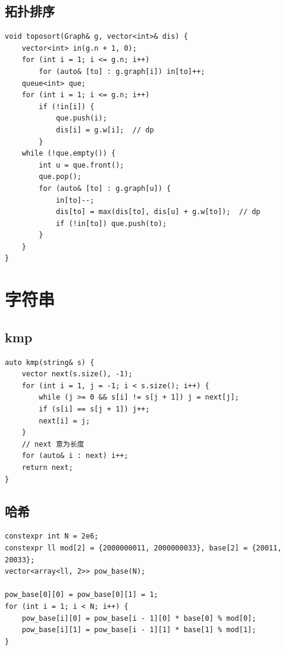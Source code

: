 \documentclass[UTF8]{ctexart}
\begin{document}
\begin{sloppypar}
\subsection{拓扑排序}

\begin{lstlisting}[style=cpp]
void toposort(Graph& g, vector<int>& dis) {
    vector<int> in(g.n + 1, 0);
    for (int i = 1; i <= g.n; i++)
        for (auto& [to] : g.graph[i]) in[to]++;
    queue<int> que;
    for (int i = 1; i <= g.n; i++)
        if (!in[i]) {
            que.push(i);
            dis[i] = g.w[i];  // dp
        }
    while (!que.empty()) {
        int u = que.front();
        que.pop();
        for (auto& [to] : g.graph[u]) {
            in[to]--;
            dis[to] = max(dis[to], dis[u] + g.w[to]);  // dp
            if (!in[to]) que.push(to);
        }
    }
}
\end{lstlisting}

\clearpage

\section{字符串}

\subsection{kmp}

\begin{lstlisting}[style=cpp]
auto kmp(string& s) {
    vector next(s.size(), -1);
    for (int i = 1, j = -1; i < s.size(); i++) {
        while (j >= 0 && s[i] != s[j + 1]) j = next[j];
        if (s[i] == s[j + 1]) j++;
        next[i] = j;
    }
    // next 意为长度
    for (auto& i : next) i++;
    return next;
}
\end{lstlisting}

\subsection{哈希}

\begin{lstlisting}[style=cpp]
constexpr int N = 2e6;
constexpr ll mod[2] = {2000000011, 2000000033}, base[2] = {20011, 20033};
vector<array<ll, 2>> pow_base(N);

pow_base[0][0] = pow_base[0][1] = 1;
for (int i = 1; i < N; i++) {
    pow_base[i][0] = pow_base[i - 1][0] * base[0] % mod[0];
    pow_base[i][1] = pow_base[i - 1][1] * base[1] % mod[1];
}


\end{lstlisting}
\end{sloppypar}
\end{document}
